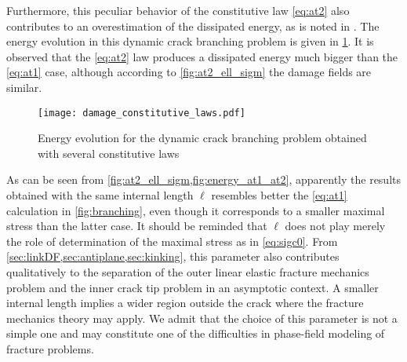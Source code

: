 Furthermore, this peculiar behavior of the constitutive law \eqref{eq:at2} also contributes to an overestimation of the dissipated energy, as is noted in \cite{BordenVerhooselScottHughesLandis:2012,VignolletMayBorstVerhoosel:2014}. The energy evolution in this dynamic crack branching problem is given in \cref{fig:energy_at1_at2}. It is observed that the \eqref{eq:at2} law produces a dissipated energy much bigger than the \eqref{eq:at1} case, although according to \cref{fig:at2_ell_sigm} the damage fields are similar.
\begin{figure}[htbp]
\centering
\texttt{[image: damage\_constitutive\_laws.pdf]}
\caption{Energy evolution for the dynamic crack branching problem obtained with several constitutive laws} \label{fig:energy_at1_at2}
\end{figure}

As can be seen from \cref{fig:at2_ell_sigm,fig:energy_at1_at2}, apparently the results obtained with the same internal length $\ell$ resembles better the \eqref{eq:at1} calculation in \cref{fig:branching}, even though it corresponds to a smaller maximal stress than the latter case. It should be reminded that $\ell$ does not play merely the role of determination of the maximal stress as in \eqref{eq:sigc0}. From \cref{sec:linkDF,sec:antiplane,sec:kinking}, this parameter also contributes qualitatively to the separation of the outer linear elastic fracture mechanics problem and the inner crack tip problem in an asymptotic context. A smaller internal length implies a wider region outside the crack where the fracture mechanics theory may apply. We admit that the choice of this parameter is not a simple one and may constitute one of the difficulties in phase-field modeling of fracture problems.

